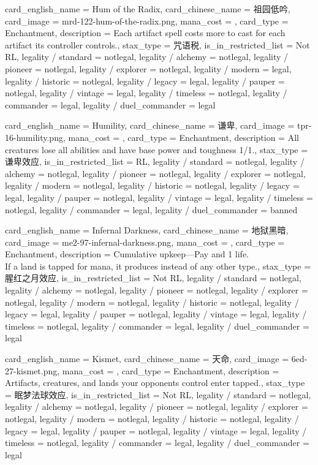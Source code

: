 \documentclass[lang = cn, color = black, 10pt]{AllThatStax}
\begin{document}
\card
{
	card_english_name = {Hum of the Radix},
	card_chinese_name = {祖园低吟},
	card_image = mrd-122-hum-of-the-radix.png,
	mana_cost = ,
	card_type = Enchantment,
	description = {Each artifact spell costs  more to cast for each artifact its controller controls.},
	stax_type = 咒语税,
	is_in_restricted_list = Not RL,
	legality / standard = notlegal,
	legality / alchemy = notlegal,
	legality / pioneer = notlegal,
	legality / explorer = notlegal,
	legality / modern = legal,
	legality / historic = notlegal,
	legality / legacy = legal,
	legality / pauper = notlegal,
	legality / vintage = legal,
	legality / timeless = notlegal,
	legality / commander = legal,
	legality / duel_commander = legal
}

\card
{
	card_english_name = {Humility},
	card_chinese_name = {谦卑},
	card_image = tpr-16-humility.png,
	mana_cost = ,
	card_type = Enchantment,
	description = {All creatures lose all abilities and have base power and toughness 1/1.},
	stax_type = 谦卑效应,
	is_in_restricted_list = RL,
	legality / standard = notlegal,
	legality / alchemy = notlegal,
	legality / pioneer = notlegal,
	legality / explorer = notlegal,
	legality / modern = notlegal,
	legality / historic = notlegal,
	legality / legacy = legal,
	legality / pauper = notlegal,
	legality / vintage = legal,
	legality / timeless = notlegal,
	legality / commander = legal,
	legality / duel_commander = banned
}

\card
{
	card_english_name = {Infernal Darkness},
	card_chinese_name = {地狱黑暗},
	card_image = me2-97-infernal-darkness.png,
	mana_cost = ,
	card_type = Enchantment,
	description = {Cumulative upkeep—Pay  and 1 life. \\
		If a land is tapped for mana, it produces  instead of any other type.},
	stax_type = 腥红之月效应,
	is_in_restricted_list = Not RL,
	legality / standard = notlegal,
	legality / alchemy = notlegal,
	legality / pioneer = notlegal,
	legality / explorer = notlegal,
	legality / modern = notlegal,
	legality / historic = notlegal,
	legality / legacy = legal,
	legality / pauper = notlegal,
	legality / vintage = legal,
	legality / timeless = notlegal,
	legality / commander = legal,
	legality / duel_commander = legal
}

\card
{
	card_english_name = {Kismet},
	card_chinese_name = {天命},
	card_image = 6ed-27-kismet.png,
	mana_cost = ,
	card_type = Enchantment,
	description = {Artifacts, creatures, and lands your opponents control enter tapped.},
	stax_type = 眠梦法球效应,
	is_in_restricted_list = Not RL,
	legality / standard = notlegal,
	legality / alchemy = notlegal,
	legality / pioneer = notlegal,
	legality / explorer = notlegal,
	legality / modern = notlegal,
	legality / historic = notlegal,
	legality / legacy = legal,
	legality / pauper = notlegal,
	legality / vintage = legal,
	legality / timeless = notlegal,
	legality / commander = legal,
	legality / duel_commander = legal
}
\end{document}

